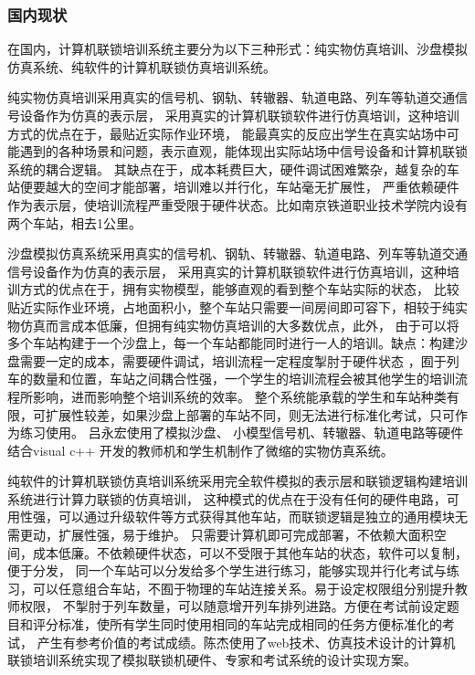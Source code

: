 \subsubsection{国内现状}

在国内，计算机联锁培训系统主要分为以下三种形式：纯实物仿真培训、沙盘模拟仿真系统\cite{电气化铁路信号计算机联锁实训系统研究与设计}、纯软件的计算机联锁仿真培训系统。

纯实物仿真培训采用真实的信号机、钢轨、转辙器、轨道电路、列车等轨道交通信号设备作为仿真的表示层，
采用真实的计算机联锁软件进行仿真培训，这种培训方式的优点在于，最贴近实际作业环境，
能最真实的反应出学生在真实站场中可能遇到的各种场景和问题，表示直观，能体现出实际站场中信号设备和计算机联锁系统的耦合逻辑。
其缺点在于，成本耗费巨大，硬件调试困难繁杂，越复杂的车站便要越大的空间才能部署，培训难以并行化，车站毫无扩展性，
严重依赖硬件作为表示层，使培训流程严重受限于硬件状态。比如南京铁道职业技术学院内设有两个车站，相去1公里。

沙盘模拟仿真系统采用真实的信号机、钢轨、转辙器、轨道电路、列车等轨道交通信号设备作为仿真的表示层，
采用真实的计算机联锁软件进行仿真培训，这种培训方式的优点在于，拥有实物模型，能够直观的看到整个车站实际的状态，
比较贴近实际作业环境，占地面积小，整个车站只需要一间房间即可容下，相较于纯实物仿真而言成本低廉，但拥有纯实物仿真培训的大多数优点，此外，
由于可以将多个车站构建于一个沙盘上，每一个车站都能同时进行一人的培训。缺点：构建沙盘需要一定的成本，需要硬件调试，培训流程一定程度掣肘于硬件状态
，囿于列车的数量和位置，车站之间耦合性强，一个学生的培训流程会被其他学生的培训流程所影响，进而影响整个培训系统的效率。
整个系统能承载的学生和车站种类有限，可扩展性较差，如果沙盘上部署的车站不同，则无法进行标准化考试，只可作为练习使用。
吕永宏使用了模拟沙盘、 小模型信号机、转辙器、轨道电路等硬件结合visual c++ 开发的教师机和学生机制作了微缩的实物仿真系统\cite{lyh}。

纯软件的计算机联锁仿真培训系统采用完全软件模拟的表示层和联锁逻辑构建培训系统进行计算力联锁的仿真培训，
这种模式的优点在于没有任何的硬件电路，可用性强，可以通过升级软件等方式获得其他车站，而联锁逻辑是独立的通用模块无需更动，扩展性强，易于维护。
只需要计算机即可完成部署，不依赖大面积空间，成本低廉。不依赖硬件状态，可以不受限于其他车站的状态，软件可以复制，便于分发，
同一个车站可以分发给多个学生进行练习，能够实现并行化考试与练习，可以任意组合车站，不囿于物理的车站连接关系。易于设定权限组分别提升教师权限，
不掣肘于列车数量，可以随意增开列车排列进路。方便在考试前设定题目和评分标准，使所有学生同时使用相同的车站完成相同的任务方便标准化的考试，
产生有参考价值的考试成绩。陈杰使用了web技术、仿真技术设计的计算机联锁培训系统实现了模拟联锁机硬件、专家和考试系统的设计实现方案\cite{cj}。
